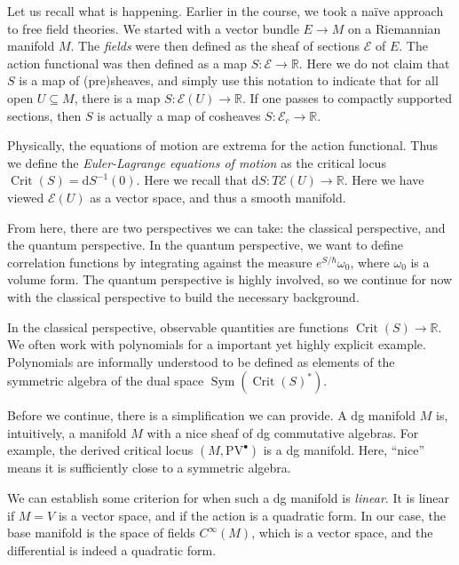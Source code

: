 
Let us recall what is happening. Earlier in the course, we took a na\"ive approach to free field theories. We started with a vector bundle $E\to M$ on a Riemannian manifold $M$. The \emph{fields} were then defined as the sheaf of sections $\mathcal{E} $ of $E$. The action functional was then defined as a map $S : \mathcal{E}  \to \mathbb{R} $. Here we do not claim that $S$ is a map of (pre)sheaves, and simply use this notation to indicate that for all open $U\subseteq M$, there is a map $S : \mathcal{E} (U) \to \mathbb{R} $. If one passes to compactly supported sections, then $S$ is actually a map of cosheaves $S : \mathcal{E} _c \to \mathbb{R} $.

Physically, the equations of motion are extrema for the action functional. Thus we define the \emph{Euler-Lagrange equations of motion} as the critical locus $\operatorname{Crit}(S)=\mathrm{d} S^{-1} (0) $. Here we recall that $\mathrm{d} S : T\mathcal{E}(U) \to \mathbb{R} $. Here we have viewed $\mathcal{E} (U)$ as a vector space, and thus a smooth manifold.

From here, there are two perspectives we can take: the classical perspective, and the quantum perspective. In the quantum perspective, we want to define correlation functions by integrating against the measure $e^{S/\hbar } \omega _0$, where $\omega _0$ is a volume form. The quantum perspective is highly involved, so we continue for now with the classical perspective to build the necessary background.

In the classical perspective, observable quantities are functions $\operatorname{Crit} (S) \to \mathbb{R} $. We often work with polynomials for a important yet highly explicit example. Polynomials are informally understood to be defined as elements of the symmetric algebra of the dual space $\operatorname{Sym} (\operatorname{Crit} (S)^*)$.

Before we continue, there is a simplification we can provide. A dg manifold $M$ is, intuitively, a manifold $M$ with a nice sheaf of dg commutative algebras. For example, the derived critical locus $(M,\mathrm{PV} ^{\bullet} )$ is a dg manifold. Here, ``nice'' means it is sufficiently close to a symmetric algebra.

We can establish some criterion for when such a dg manifold is \emph{linear}. It is linear if $M=V$ is a vector space, and if the action is a quadratic form. In our case, the base manifold is the space of fields $C^\infty (M)$, which is a vector space, and the differential is indeed a quadratic form.

